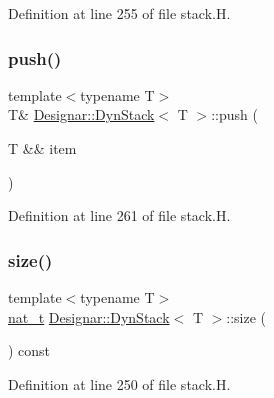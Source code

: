 Definition at line 255 of file stack.\+H.

\mbox{\label{class_designar_1_1_dyn_stack_a1eff6c891fd3800c6aa55f35e14e4f88}} 
\subsubsection{\texorpdfstring{push()}{push()}\hspace{0.1cm}{\footnotesize\ttfamily [2/2]}}
{\footnotesize\ttfamily template$<$typename T$>$ \\
T\& \hyperlink{class_designar_1_1_dyn_stack}{Designar\+::\+Dyn\+Stack}$<$ T $>$\+::push (\begin{DoxyParamCaption}\item[{T \&\&}]{item }\end{DoxyParamCaption})\hspace{0.3cm}{\ttfamily [inline]}}



Definition at line 261 of file stack.\+H.

\mbox{\label{class_designar_1_1_dyn_stack_a4c15622a5283c072287a7dfdd6c4bd2d}} 
\subsubsection{\texorpdfstring{size()}{size()}}
{\footnotesize\ttfamily template$<$typename T$>$ \\
\hyperlink{namespace_designar_aa72662848b9f4815e7bf31a7cf3e33d1}{nat\+\_\+t} \hyperlink{class_designar_1_1_dyn_stack}{Designar\+::\+Dyn\+Stack}$<$ T $>$\+::size (\begin{DoxyParamCaption}{ }\end{DoxyParamCaption}) const\hspace{0.3cm}{\ttfamily [inline]}}



Definition at line 250 of file stack.\+H.

\mbox{\label{class_designar_1_1_dyn_stack_a33e8c623bae518ed88cdee01602febb0}} 
